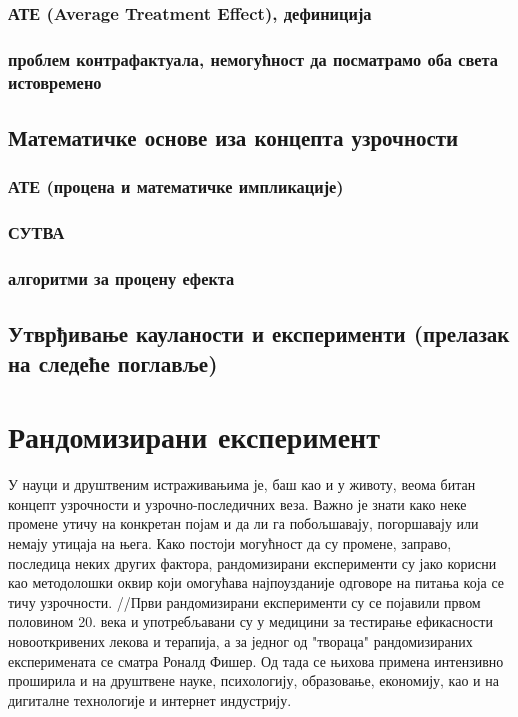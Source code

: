 \documentclass[12pt, a4paper]{article}
\begin{document}

    \subsubsection{АТЕ (Average Treatment Effect), дефиниција}
    \subsubsection{проблем контрафактуала, немогућност да посматрамо оба света истовремено}
\subsection{Математичке основе иза концепта узрочности}
    \subsubsection{АТЕ (процена и математичке импликације)}
    \subsubsection{СУТВА}
    \subsubsection{алгоритми за процену ефекта}
\subsection{Утврђивање кауланости и експерименти (прелазак на следеће поглавље)}

\newpage



\section{Рандомизирани експеримент}

У науци и друштвеним истраживањима је, баш као и у животу, веома битан концепт узрочности и 
узрочно-последичних веза. Важно је знати како неке промене утичу на конкретан појам и да ли га 
побољшавају, погоршавају или немају утицаја на њега. Како постоји могућност да су промене, 
заправо, последица неких других фактора, рандомизирани експерименти су јако корисни као 
методолошки оквир који омогућава најпоузданије одговоре на питања која се тичу узрочности.
//Први рандомизирани експерименти су се појавили првом половином 20. века и употребљавани су у 
медицини за тестирање ефикасности новооткривених лекова и терапија, а за једног од "твораца" 
рандомизираних експеримената се сматра Роналд Фишер. Од тада се њихова примена интензивно 
проширила и на друштвене науке, психологију, образовање, економију, као и на дигиталне технологије 
и интернет индустрију.
\end{document}
